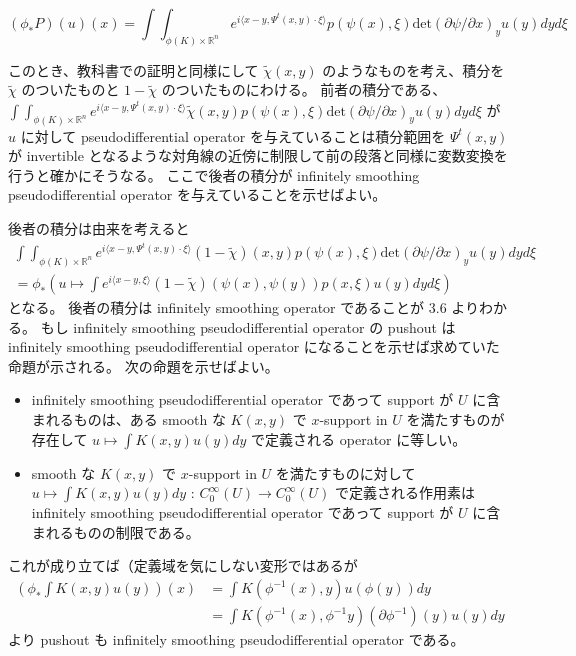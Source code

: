 \documentclass[dvipdfmx]{jsarticle}
\begin{document}
\[
  (\phi_* P)(u)(x) = \int \int_{\phi(K) \times \mathbb{R}^n} e^{i \langle x - y , \Psi^t(x,y) \cdot \xi \rangle} p(\psi(x) , \xi) \text{det} (\partial \psi / \partial x)_y u(y) dy d\xi
\]

このとき、教科書での証明と同様にして \(\tilde{\chi}(x,y)\) のようなものを考え、積分を \(\tilde{\chi}\) のついたものと \(1 - \tilde{\chi}\) のついたものにわける。
前者の積分である、 \(\int \int_{\phi(K) \times \mathbb{R}^n} e^{i \langle x - y , \Psi^t(x,y) \cdot \xi \rangle} \tilde{\chi}(x,y) p(\psi(x) , \xi) \text{det} (\partial \psi / \partial x)_y u(y) dy d\xi\) が \(u\) に対して pseudodifferential operator を与えていることは積分範囲を \(\Psi^t(x,y)\) が invertible となるような対角線の近傍に制限して前の段落と同様に変数変換を行うと確かにそうなる。
ここで後者の積分が infinitely smoothing pseudodifferential operator を与えていることを示せばよい。

後者の積分は由来を考えると
\begin{align*}
  \int \int_{\phi(K) \times \mathbb{R}^n} e^{i \langle x - y , \Psi^t(x,y) \cdot \xi \rangle} (1 - \tilde{\chi})(x,y) p(\psi(x) , \xi) \text{det} (\partial \psi / \partial x)_y u(y) dy d\xi \\
  =
  \phi_* (u \mapsto \int e^{i \langle x-y , \xi \rangle} (1 - \tilde{\chi})(\psi(x) , \psi(y)) p(x,\xi)u(y) dy d\xi)
\end{align*}
となる。
後者の積分は infinitely smoothing operator であることが 3.6 よりわかる。
もし infinitely smoothing pseudodifferential operator の pushout は infinitely smoothing pseudodifferential operator になることを示せば求めていた命題が示される。
次の命題を示せばよい。
\begin{itemize}
  \item infinitely smoothing pseudodifferential operator であって support が \(U\) に含まれるものは、ある smooth な \(K(x,y)\) で \(x\)-support in \(U\) を満たすものが存在して \(u \mapsto \int K(x,y)u(y)dy\) で定義される operator に等しい。
  \item smooth な \(K(x,y)\) で \(x\)-support in \(U\) を満たすものに対して \(u \mapsto \int K(x,y)u(y)dy\) : \(C^\infty_0(U) \to C^\infty_0(U)\) で定義される作用素は infinitely smoothing pseudodifferential operator であって support が \(U\) に含まれるものの制限である。
\end{itemize}
これが成り立てば（定義域を気にしない変形ではあるが
\begin{align*}
  (\phi_* \int K(x,y)u(y))(x)
  &= \int K(\phi^{-1}(x) , y) u(\phi(y)) dy \\
  &= \int K(\phi^{-1}(x) , \phi^{-1}y) (\partial \phi^{-1})(y) u(y) dy
\end{align*}
より pushout も infinitely smoothing pseudodifferential operator である。
\end{document}
